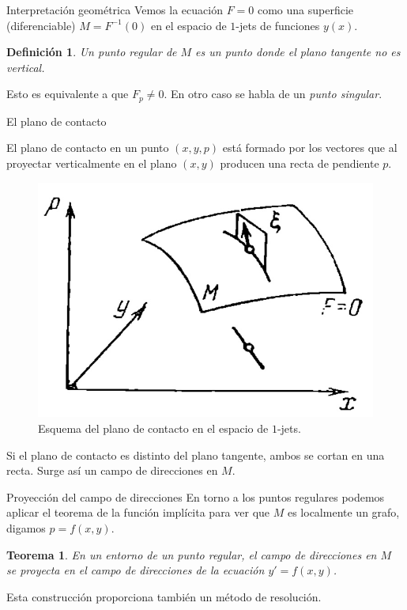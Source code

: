 \documentclass[10pt, spanish]{beamer}
\newtheorem{teorema}{Teorema}
\newtheorem{defi}{Definición}
\begin{document}
\begin{frame}{Interpretación geométrica}
  Vemos la ecuación $F=0$ como una superficie (diferenciable) $M=F^{-1}(0)$ en el espacio de $1$-jets de funciones $y(x)$.

\vspace{0.75em}
  \begin{defi}
    Un \textit{punto regular} de $M$ es un punto donde el plano tangente no es vertical.
  \end{defi}

  Esto es equivalente a que $F_p\neq 0$. En otro caso se habla de un \textit{punto singular}.

\end{frame}

\begin{frame}{El plano de contacto}

  El plano de contacto en un punto $(x,y,p)$ está formado por los vectores que al proyectar verticalmente en el plano $(x, y)$ producen una recta de pendiente $p$.
  \begin{figure}
	\centering
	\includegraphics[width=.4\textwidth]{../figures/jets}
	\caption{\footnotesize Esquema del plano de contacto en el espacio de $1$-jets.}
  \end{figure}
  Si el plano de contacto es distinto del plano tangente, ambos se cortan en una recta. Surge así un campo de direcciones en $M$.

\end{frame}

\begin{frame}{Proyección del campo de direcciones}
  En torno a los puntos regulares podemos aplicar el teorema de la función implícita para ver que $M$ es localmente un grafo, digamos $p=f(x,y)$.
  \vspace{0.5em}

\begin{teorema}
  En un entorno de un punto regular, el campo de direcciones en $M$ se proyecta en el campo de direcciones de la ecuación $y'=f(x,y)$.
\end{teorema}

  \vspace{0.5em}
  Esta construcción proporciona también un método de resolución.
\end{frame}
\end{document}
